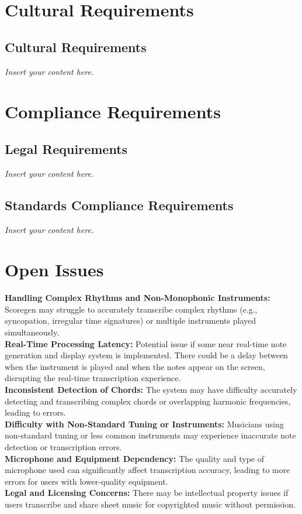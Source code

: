\documentclass[12pt]{article}
\newcommand{\lips}{\textit{Insert your content here.}}
\begin{document}
\section{Cultural Requirements}
\subsection{Cultural Requirements}
\lips

\section{Compliance Requirements}
\subsection{Legal Requirements}
\lips
\subsection{Standards Compliance Requirements}
\lips

\section{Open Issues}

\textbf{Handling Complex Rhythms and Non-Monophonic Instruments:} Scoregen may struggle to accurately transcribe complex rhythms (e.g., syncopation, irregular time signatures) or multiple instruments played simultaneously. \\
\textbf{Real-Time Processing Latency:  }Potential issue if some near real-time note generation and display system is implemented. There could be a delay between when the instrument is played and when the notes appear on the screen, disrupting the real-time transcription experience. \\
\textbf{Inconsistent Detection of Chords:}  The system may have difficulty accurately detecting and transcribing complex chords or overlapping harmonic frequencies, leading to errors. \\
\textbf{Difficulty with Non-Standard Tuning or Instruments:} Musicians using non-standard tuning or less common instruments may experience inaccurate note detection or transcription errors. \\
\textbf{Microphone and Equipment Dependency:} The quality and type of microphone used can significantly affect transcription accuracy, leading to more errors for users with lower-quality equipment. \\
\textbf{Legal and Licensing Concerns:} There may be intellectual property issues if users transcribe and share sheet music for copyrighted music without permission.
\end{document}
